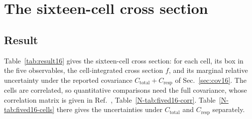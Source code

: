 \section{The sixteen-cell cross section}
\label{sec:result16}

\subsection{Result}

Table~\ref{tab:result16} gives the sixteen-cell cross section: for each cell, its box in the five observables, the
cell-integrated cross section $f$, and its marginal relative uncertainty under the reported covariance
$C_{\mathrm{total}}+C_{\mathrm{resp}}$ of Sec.~\ref{sec:cov16}.
The cells are correlated, so quantitative comparisons need the full covariance, whose correlation matrix is given in
Ref.~\cite{AnalysisNote2026}, Table~\ref*{N-tab:fived16-corr}.
Table~\ref*{N-tab:fived16-cells} there gives the uncertainties under $C_{\mathrm{total}}$ and $C_{\mathrm{resp}}$
separately.

